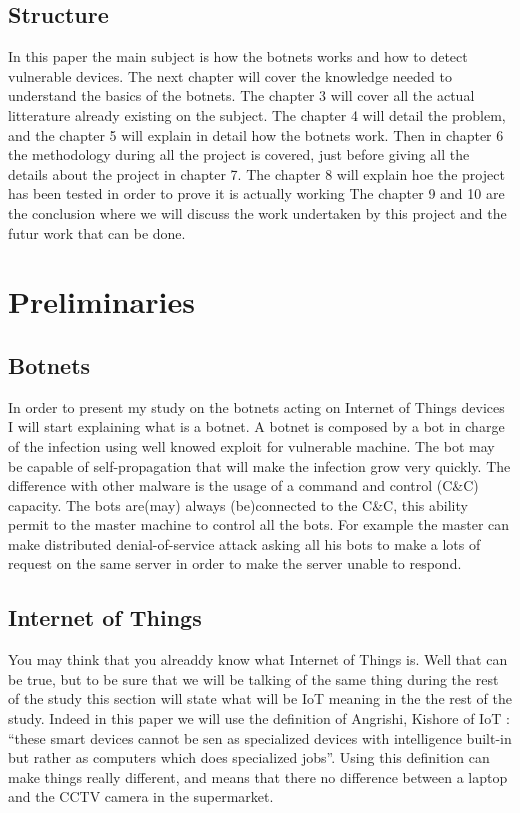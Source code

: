\documentclass{report}
\begin{document}
\section{Structure}
In this paper the main subject is how the botnets works and how to detect vulnerable devices.\newline
The next chapter will cover the knowledge needed to understand the basics of the botnets. The chapter 3 will cover all the actual litterature already existing on the subject.\newline
The chapter 4 will detail the problem, and the chapter 5 will explain in detail how the botnets work.\newline
Then in chapter 6 the methodology during all the project is covered, just before giving all the details about the project in chapter 7. The chapter 8 will explain hoe the project has been tested in order to prove it is actually working\newline
The chapter 9 and 10 are the conclusion where we will discuss the work undertaken by this project and the futur work that can be done. 


\chapter{Preliminaries}
\section{Botnets}
In order to present my study on the botnets acting on Internet of Things devices I will start explaining what is a botnet. A botnet is composed by a bot in charge of the infection using well knowed exploit for vulnerable machine. The bot may be capable of self-propagation that will make the infection grow very quickly. The difference with other malware is the usage of a command and control (C\&C) capacity. The bots are(may) always (be)connected to the C\&C, this ability permit to the master machine to control all the bots. For example the master can make distributed denial-of-service attack asking all his bots to make a lots of request on the same server in order to make the server unable to respond.

\section{Internet of Things}
\label{sec:preiot}
You may think that you alreaddy know what Internet of Things is. Well that can be true, but to be sure that we will be talking of the same thing during the rest of the study this section will state what will be IoT meaning in the the rest of the study. Indeed in this paper we will use the definition of Angrishi, Kishore \autocite{angrishi2017turning} of IoT : ``these smart devices cannot be sen as specialized devices with intelligence built-in but rather as computers which does specialized jobs''. Using this definition can make things really different, and means that there no difference between a laptop and the CCTV camera in the supermarket.
\end{document}

